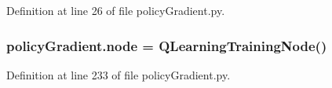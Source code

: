 Definition at line 26 of file policy\+Gradient.\+py.

\subsubsection[{\texorpdfstring{node}{node}}]{\setlength{\rightskip}{0pt plus 5cm}policy\+Gradient.\+node = {\bf Q\+Learning\+Training\+Node}()}\hypertarget{namespacepolicy_gradient_ac222664eb440174c418a8dbce461d1ed}{}\label{namespacepolicy_gradient_ac222664eb440174c418a8dbce461d1ed}


Definition at line 233 of file policy\+Gradient.\+py.


